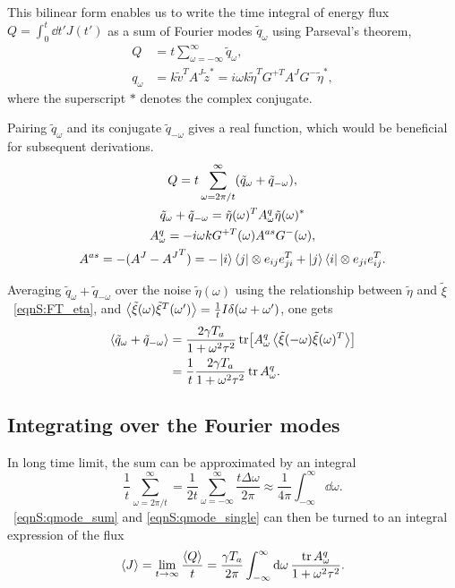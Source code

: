 \documentclass[
 amsmath,amssymb,
 aps,
 pre,
 longbibliography,
 10pt, onecolumn,
 notitlepage
]{revtex4-1}
\begin{document}
This bilinear form enables us to write the time integral of energy flux $Q = \int_0^t \dd{t'} J(t')$ as a sum of Fourier modes $\tilde{q}_\omega$ using Parseval's theorem,
\begin{align}
    Q &= t\sum_{\omega=-\infty}^{\infty} \tilde{q}_\omega, \\
    q_\omega &= k\tilde{v}^T A^{J} \tilde{z}^*
    = i\omega k \tilde{\eta}^TG^{+T}A^{J}G^-\tilde{\eta}^* ,
\end{align}
where the superscript $*$ denotes the complex conjugate.

Pairing $\tilde{q}_\omega$ and its conjugate $\tilde{q}_{-\omega}$ gives a real function, which would be beneficial for subsequent derivations.
\begin{gather}
    Q = t\sum_{\omega=2\pi/t}^{\infty} (\tilde{q}_\omega + \tilde{q}_{-\omega}), \label{eqnS:qmode_sum}\\
    \tilde{q}_\omega + \tilde{q}_{-\omega} = \tilde{\eta}(\omega)^T A_\omega^q \tilde{\eta}(\omega)^* \\
    A_\omega^q = -i\omega k G^{+T}(\omega) A^{as} G^-(\omega), \\
    A^{as} = -(A^{J} - {A^{J}}^T)
    = -\ket{i}\bra{j} \otimes e_{ij}e_{ji}^T + \ket{j}\bra{i} \otimes e_{ji}e_{ij}^T.
\end{gather}

Averaging $\tilde{q}_\omega + \tilde{q}_{-\omega}$ over the noise $\tilde{\eta}(\omega)$ using the relationship between $\tilde{\eta}$ and $\tilde{\xi}$ \eqnname~\eqref{eqnS:FT_eta}, and $\expval{\tilde{\xi}(\omega) \tilde{\xi}^T(\omega')} = \frac{1}{t} I \delta(\omega + \omega')$, one gets
\begin{equation} \label{eqnS:qmode_single}
\begin{split}
\expval{\tilde{q}_\omega + \tilde{q}_{-\omega}}
&= \frac{2\gamma T_a}{1 + \omega^2 \tau^2} \tr[A_\omega^q \expval{\tilde{\xi}(-\omega)\tilde{\xi}(\omega)^T}] \\
&= \frac{1}{t} \frac{2\gamma T_a}{1 + \omega^2 \tau^2} \tr A_\omega^q .
\end{split}
\end{equation}

\subsection{Integrating over the Fourier modes}

In long time limit, the sum can be approximated by an integral
\begin{equation}
\frac{1}{t} \sum_{\omega=2\pi/t}^{\infty}
= \frac{1}{2t} \sum_{\omega=-\infty}^{\infty} \frac{t \Delta\omega}{2\pi}
\approx \frac{1}{4\pi}\int_{-\infty}^{\infty} \dd{\omega} .
\end{equation}
\eqnname~\eqref{eqnS:qmode_sum} and \eqref{eqnS:qmode_single} can then be turned to an integral expression of the flux
\begin{equation} \label{eqnS:flux_integral_raw}
\expval{J} = \lim_{t\rightarrow \infty} \frac{\expval{Q}}{t}
= \frac{\gamma T_a}{2\pi} \int_{-\infty}^{\infty} \dd{\omega} \frac{\tr A_\omega^q}{1+\omega^2\tau^2} .
\end{equation}
\end{document}

